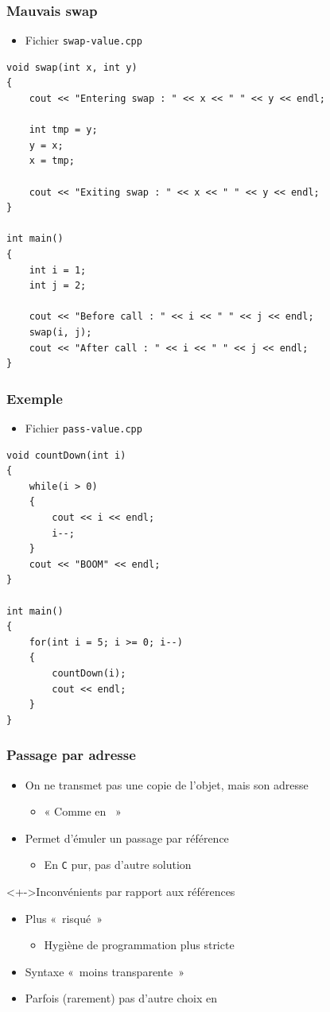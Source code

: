 \begin{frame}[containsverbatim]
\frametitle{Mauvais swap}
\begin{itemize}
\item Fichier \texttt{swap-value.cpp}
\end{itemize}
\begin{lstlisting}
void swap(int x, int y)
{
	cout << "Entering swap : " << x << " " << y << endl;	

	int tmp = y;
	y = x;
	x = tmp;

	cout << "Exiting swap : " << x << " " << y << endl;
}

int main()
{
	int i = 1;
	int j = 2;

	cout << "Before call : " << i << " " << j << endl;
	swap(i, j);
	cout << "After call : " << i << " " << j << endl;
}
\end{lstlisting}
\end{frame}

\begin{frame}[containsverbatim]
\frametitle{Exemple}
\begin{itemize}
\item Fichier \texttt{pass-value.cpp}
\end{itemize}
\begin{lstlisting}
void countDown(int i)
{
	while(i > 0)
	{
		cout << i << endl;
		i--;
	}
	cout << "BOOM" << endl;
}

int main()
{
	for(int i = 5; i >= 0; i--)
	{
		countDown(i);
		cout << endl;
	}
}
\end{lstlisting}
\end{frame}

\begin{frame}
\frametitle{Passage par adresse}
\begin{itemize}[<+->]
\item On ne transmet pas une copie de l'objet, mais son adresse
	\begin{itemize}
	\item « Comme en \java\ »
	\end{itemize}
\item Permet d'émuler un passage par référence
	\begin{itemize}
	\item En \texttt{C} pur, pas d'autre solution
	\end{itemize}
\end{itemize}
\begin{alertblock}<+->{Inconvénients par rapport aux références}
	\begin{itemize}[<+->]
	\item Plus «~risqué~»
		\begin{itemize}
		\item Hygiène de programmation plus stricte
		\end{itemize}
	\item Syntaxe «~moins transparente~»
	\end{itemize}
\end{alertblock}
\begin{itemize}[<+->]
\item Parfois (rarement) pas d'autre choix en \cpp
\end{itemize}
\end{frame}

